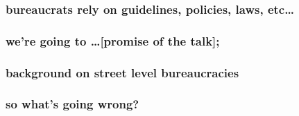 \documentclass[presentation]{subfiles}
\begin{document}
\begin{frame}\frametitle{bureaucrats rely on guidelines, policies, laws, etc\dots}

\end{frame}


\begin{frame}\frametitle{we're going to \dots [promise of the talk];}

\end{frame}


\begin{frame}\frametitle{background on street level bureaucracies}

\end{frame}


\begin{frame}\frametitle{so what's going wrong?}

\end{frame}
\end{document}
